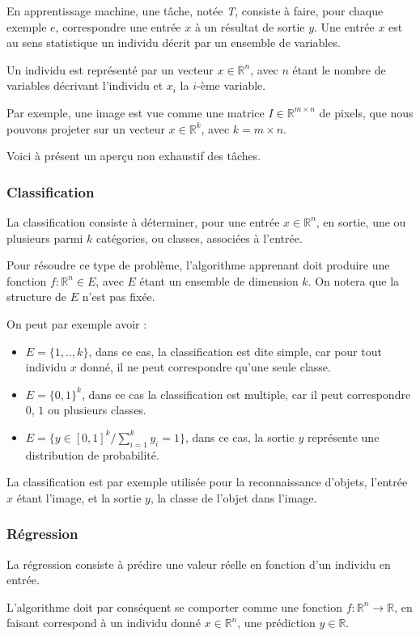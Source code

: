 \documentclass[a4paper, 11pt]{report}
\begin{document}
En apprentissage machine, une tâche, notée \emph{T}, consiste à faire, pour chaque exemple $e$, correspondre une entrée $x$ à un résultat de sortie $y$.
Une entrée $x$ est au sens statistique un individu décrit par un ensemble de variables.
\begin{center}
	Un individu est représenté par un vecteur $x \in \mathbb{R}^n$, avec $n$ étant le nombre de variables décrivant l'individu et $x_i$ la $i$-ème variable.
\end{center}
Par exemple, une image est vue comme une matrice $I \in \mathbb{R}^{m \times n}$ de pixels, que nous pouvons projeter sur un vecteur $x \in \mathbb{R}^k$, avec $k = m \times n$.

Voici à présent un aperçu non exhaustif des tâches.
\subsubsection{Classification}
La classification consiste à déterminer, pour une entrée $x \in \mathbb{R}^n$, en sortie, une ou plusieurs parmi $k$ catégories, ou classes, associées à l'entrée.

Pour résoudre ce type de problème, l'algorithme apprenant doit produire une fonction $f : \mathbb{R}^n \in E$, avec $E$ étant un ensemble de dimension $k$.
On notera que la structure de $E$ n'est pas fixée.

On peut par exemple avoir :
\begin{itemize}
	\item $E = \{1,..,k\}$, dans ce cas, la classification est dite simple, car pour tout individu $x$ donné, il ne peut correspondre qu'une seule classe.
	\item $E = \{0,1\}^k$, dans ce cas la classification est multiple, car il peut correspondre $0$, $1$ ou plusieurs classes.
	\item $E = \{y \in [0,1]^k/ \sum_{i=1}^{k}{y_i}=1  \}$, dans ce cas, la sortie $y$ représente une distribution de probabilité.
\end{itemize}
La classification est par exemple utilisée pour la reconnaissance d'objets, l'entrée $x$ étant l'image, et la sortie $y$, la classe de l'objet dans l'image.
\subsubsection{Régression}
La régression consiste à prédire une valeur réelle en fonction d'un individu en entrée.

L'algorithme doit par conséquent se comporter comme une fonction $f : \mathbb{R}^n \rightarrow \mathbb{R}$, en faisant correspond à un individu donné $x \in \mathbb{R}^n$, une prédiction $y \in \mathbb{R}$.
\end{document}
